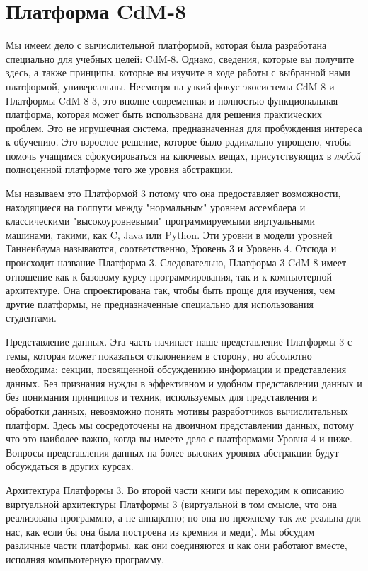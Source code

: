 \section{Платформа CdM-8}

Мы имеем дело с вычислительной платформой, которая была разработана специально для учебных целей: CdM-8.  Однако, сведения, которые вы получите здесь, а также принципы, которые вы изучите в ходе работы с выбранной нами платформой, универсальны.  Несмотря на узкий фокус экосистемы CdM-8 и Платформы CdM-8 3, это вполне современная и полностью функциональная платформа, которая может быть использована для решения практических проблем.  Это не игрушечная система, предназначенная для пробуждения интереса к обучению.  Это взрослое решение, которое было радикально упрощено, чтобы помочь учащимся сфокусироваться на ключевых вещах, присутствующих в \emph{любой} полноценной платформе того же уровня абстракции.

Мы называем это Платформой 3 потому что она предоставляет возможности, находящиеся на полпути между "нормальным" уровнем ассемблера и классическими "высокоуровневыми" программируемыми виртуальными машинами, такими, как C, Java  или Python.  Эти уровни в модели уровней Танненбаума называются, соответственно, Уровень 3 и Уровень 4.  Отсюда и происходит название Платформа 3.  Следовательно, Платформа 3 CdM-8 имеет отношение как к базовому курсу программирования, так и к компьютерной архитектуре.  Она спроектирована так, чтобы быть проще для изучения, чем другие платформы, не предназначенные специально для использования студентами.

Представление данных.  Эта часть начинает наше представление Платформы 3 с темы, которая может показаться отклонением в сторону, но абсолютно необходима: секции, посвященной обсуждениию информации и представления данных.  Без признания нужды в эффективном и удобном представлении данных и без понимания принципов и техник, используемых для представления и обработки данных, невозможно понять мотивы разработчиков вычислительных платформ.  Здесь мы сосредоточены на двоичном представлении данных, потому что это наиболее важно, когда вы имеете дело с платформами Уровня 4 и ниже.  Вопросы представления данных на более высоких уровнях абстракции будут обсуждаться в других курсах.

Архитектура Платформы 3.  Во второй части книги мы переходим к описанию виртуальной архитектуры Платформы 3 (виртуальной в том смысле, что она реализована программно, а не аппаратно; но она по прежнему так же реальна для нас, как если бы она была построена из кремния и меди).  Мы обсудим различные части платформы, как они соединяются и как они работают вместе, исполняя компьютерную программу.

